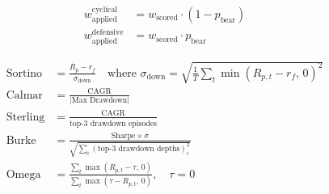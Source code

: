 \documentclass[11pt, a4paper]{article}
\begin{document}
\begin{align}
  w_{\text{applied}}^{\text{cyclical}}  &= w_{\text{scored}} \cdot (1 - p_{\text{bear}}) \\
  w_{\text{applied}}^{\text{defensive}} &= w_{\text{scored}} \cdot p_{\text{bear}}
\end{align}

\begin{align*}
  \text{Sortino}  &= \frac{\overline{R}_p - r_f}{\sigma_{\text{down}}}
                   \quad\text{where } \sigma_{\text{down}} = \sqrt{\tfrac{1}{T}\textstyle\sum_t \min(R_{p,t}-r_f,\,0)^2} \\[4pt]
  \text{Calmar}   &= \frac{\text{CAGR}}{|\text{Max Drawdown}|} \\[4pt]
  \text{Sterling} &= \frac{\text{CAGR}}{\overline{\text{top-3 drawdown episodes}}} \\[4pt]
  \text{Burke}    &= \frac{\text{Sharpe} \times \sigma}
                          {\sqrt{\sum_i (\text{top-3 drawdown depths})_i^2}} \\[4pt]
  \text{Omega}    &= \frac{\sum_t \max(R_{p,t} - \tau,\,0)}
                          {\sum_t \max(\tau - R_{p,t},\,0)}, \quad \tau = 0
\end{align*}
\end{document}
